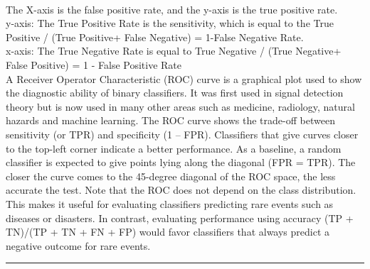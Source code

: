 \documentclass[11pt]{article}
\begin{document}
    \begin{center}
    \end{center}
    { \hspace*{\fill} \\}
    
    The X-axis is the false positive rate, and the y-axis is the true
positive rate.\\
y-axis: The True Positive Rate is the sensitivity, which is equal to the
True Positive / (True Positive+ False Negative) = 1-False Negative
Rate.\\
x-axis: The True Negative Rate is equal to True Negative / (True
Negative+ False Positive) = 1 - False Positive Rate\\
A Receiver Operator Characteristic (ROC) curve is a graphical plot used
to show the diagnostic ability of binary classifiers. It was first used
in signal detection theory but is now used in many other areas such as
medicine, radiology, natural hazards and machine learning. The ROC curve
shows the trade-off between sensitivity (or TPR) and specificity (1 --
FPR). Classifiers that give curves closer to the top-left corner
indicate a better performance. As a baseline, a random classifier is
expected to give points lying along the diagonal (FPR = TPR). The closer
the curve comes to the 45-degree diagonal of the ROC space, the less
accurate the test. Note that the ROC does not depend on the class
distribution. This makes it useful for evaluating classifiers predicting
rare events such as diseases or disasters. In contrast, evaluating
performance using accuracy (TP + TN)/(TP + TN + FN + FP) would favor
classifiers that always predict a negative outcome for rare events.

    \begin{center}\rule{0.5\linewidth}{\linethickness}\end{center}


    
    
    
    
\end{document}
